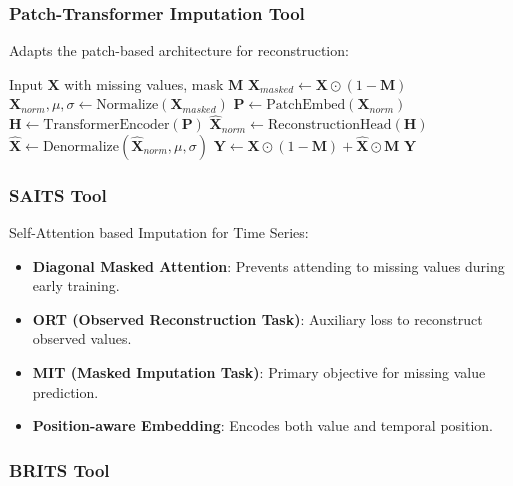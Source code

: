 \subsubsection{Patch-Transformer Imputation Tool}

Adapts the patch-based architecture for reconstruction:

\begin{algorithm}[H]
\caption{Patch-Transformer Imputation}
\label{alg:patch_impute}
\begin{algorithmic}[1]
\REQUIRE Input $\mathbf{X}$ with missing values, mask $\mathbf{M}$
\STATE $\mathbf{X}_{masked} \leftarrow \mathbf{X} \odot (1 - \mathbf{M})$ 
\STATE $\mathbf{X}_{norm}, \mu, \sigma \leftarrow \text{Normalize}(\mathbf{X}_{masked})$
\STATE $\mathbf{P} \leftarrow \text{PatchEmbed}(\mathbf{X}_{norm})$
\STATE $\mathbf{H} \leftarrow \text{TransformerEncoder}(\mathbf{P})$
\STATE $\hat{\mathbf{X}}_{norm} \leftarrow \text{ReconstructionHead}(\mathbf{H})$ 
\STATE $\hat{\mathbf{X}} \leftarrow \text{Denormalize}(\hat{\mathbf{X}}_{norm}, \mu, \sigma)$
\STATE $\mathbf{Y} \leftarrow \mathbf{X} \odot (1 - \mathbf{M}) + \hat{\mathbf{X}} \odot \mathbf{M}$ 
\RETURN $\mathbf{Y}$
\end{algorithmic}
\end{algorithm}

\subsubsection{SAITS Tool}

Self-Attention based Imputation for Time Series:

\begin{itemize}[leftmargin=*, itemsep=1pt]
    \item \textbf{Diagonal Masked Attention}: Prevents attending to missing values during early training.
    \item \textbf{ORT (Observed Reconstruction Task)}: Auxiliary loss to reconstruct observed values.
    \item \textbf{MIT (Masked Imputation Task)}: Primary objective for missing value prediction.
    \item \textbf{Position-aware Embedding}: Encodes both value and temporal position.
\end{itemize}

\subsubsection{BRITS Tool}

